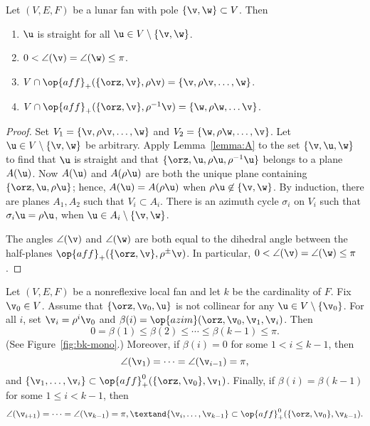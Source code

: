 \begin{lemma}
\label{lemma:lunar}
Let $(V,E,F)$ be a lunar fan with pole $\{\v,\w\}\subset V$.  
Then
\begin{enumerate}\wasitemize 
\item $\u$ is straight for all $\u\in V\setminus \{\v,\w\}$. \vspace{3pt}
\item $0< \angle(\v) = \angle(\w)\le \pi$. \vspace{3pt}
\item $V\cap \op{aff}_+(\{\orz,\v\},\rho \v) = \{\v,\rho \v,\ldots,
\w\}$. \vspace{3pt}
\item $V \cap \op{aff}_+(\{\orz,\v\},\rho^{-1} \v) = \{\w,\rho
\w,\ldots \v\}$. \vspace{3pt}
\end{enumerate}\wasitemize 
\end{lemma}

\begin{proof} Set $V_1 = \{\v,\rho \v,\ldots,\w\}$ and $V_2 =
\{\w,\rho \w,\ldots,\v\}$.  Let $\u\in V\setminus\{\v,\w\}$ be
arbitrary.  Apply Lemma~\ref{lemma:A} to the set $\{\v,\u,\w\}$ to
find that $\u$ is straight and that $\{\orz,\u,\rho \u,\rho^{-1} \u\}$
belongs to a plane $A(\u)$.  Now $A(\u)$ and $A(\rho \u)$ are both
the unique plane containing $\{\orz,\u,\rho \u\}$; hence, $A(\u) =
A(\rho \u)$ when $\rho \u\not\in \{\v,\w\}$.  By induction, there
are planes $A_1, A_2$ such that $V_i\subset A_i$.  There is an
azimuth cycle $\sigma_i$ on $V_i$ such that $\sigma_i \u = \rho \u$,
when $\u \in A_i\setminus \{\v,\w\}$.

The angles $\angle(\v)$ and $\angle(\w)$ are both equal to the
dihedral angle between the half-planes
$\op{aff}_+(\{\orz,\v\},\rho^{\pm}\v)$.  In particular,
$0<\angle(\v)=\angle(\w)\le\pi$.
\end{proof}




\begin{lemma}[monotonicity] 
\label{lemma:monotone}
Let $(V,E,F)$ be a nonreflexive local fan and let $k$ be the cardinality
of $F$.  Fix $\v_0\in V$.  Assume that
$\{\orz,\v_0,\u\}$ is not collinear for any $\u\in
V\setminus\{\v_0\}$.  For all $i$, set $\v_i = \rho^i \v_0$ and
$\beta(i) = \op{azim}(\orz,\v_0,\v_1,\v_i)$.  Then
\[ 0=\beta(1)\le \beta(2)\le \cdots\le
\beta(k-1)\le\pi.\] 
(See Figure~\ref{fig:bk-mono}.)
Moreover, if $\beta(i)=0$ for some $1<i \le k-1$, then
\[ 
\angle(\v_1) = \cdots = \angle(\v_{i-1}) = \pi,
\] 
and $\{\v_1,\ldots,\v_i\} \subset \op{aff}^0_+(\{\orz,\v_0\},\v_1)$.
Finally, if $\beta(i)=\beta(k-1)$ for some $1\le i<k-1$, then 
\[ 
\angle(\v_{i+1}) = \cdots = \angle(\v_{k-1}) = \pi,
\textand  \{\v_i,\ldots,\v_{k-1}\} \subset
\op{aff}^0_+(\{\orz,\v_0\},\v_{k-1}).
\]
\end{lemma}

